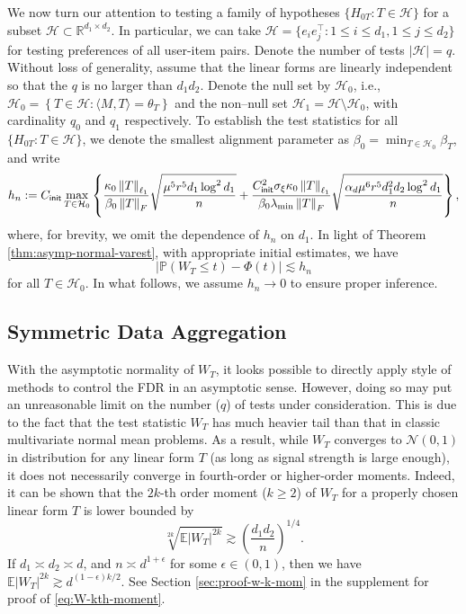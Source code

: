 \documentclass[12pt]{article}
\newcommand{\tF}{{\rm F}}
\newcommand{\abs}[1]{\left\lvert#1\right\rvert}
\newcommand{\norm}[1]{\left\lVert#1\right\rVert}
\newcommand{\R}{\mathbb{R}}
\newcommand{\E}{\mathbb{E}}
\newcommand{\cH}{\mathcal{H}}
\newcommand{\cN}{\mathcal{N}}
\newcommand{\init}{{\mathsf{init}}}
\theoremstyle{plain}
\begin{document}
\begin{sloppypar}
We now turn our attention to testing a family of hypotheses $\{H_{0T}: T\in \cH\}$ for a subset $\cH\subset \R^{d_1\times d_2}$. In particular, we can take $\cH=\{e_i e_j^\top: 1\le i\le d_1, 1\le j\le d_2\}$ for testing preferences of all user-item pairs. Denote the number of tests $\abs{\cH}=q$. Without loss of generality, assume that the linear forms are linearly independent so that the $q$ is no larger than $d_1 d_2$.  Denote the null set by $\cH_0$, i.e., $\cH_0=\left\{T\in \cH: \langle M,T\rangle=\theta_T \right\}$ and the non–null set $\cH_1=\cH\setminus \cH_0$, with cardinality $q_0$ and $q_1$ respectively. To establish the test statistics for all $\{H_{0T}: T\in \cH\}$, we denote the smallest alignment parameter as $\beta_0=\min_{T\in\cH_0}\beta_T$, and write
\begin{equation}\label{eq:fixed-asymp}
h_n:=  C_{\init} \max_{T\in\cH_0} \left\{ \frac{\kappa_0\norm{T}_{\ell_1}}{\beta_0 \norm{T}_{\tF}} \sqrt{\frac{ \mu^{5} r^5 d_1 \log^2 d_1  }{ n}} +  \frac{ C_{\init}^2\sigma_{\xi}  \kappa_0 \norm{T}_{\ell_1} }{\beta_0 \lambda_{\min}  \norm{T}_\tF }\sqrt{\frac{\alpha_d \mu^{6} r^{5 } d_1^2 d_2  \log^2 d_1 }{ n } } \right\},
\end{equation}
where, for brevity, we omit the dependence of $h_n$ on $d_1$. In light of Theorem \ref{thm:asymp-normal-varest}, with appropriate initial estimates, we have
$$
\left|\mathbb{P}\left(W_{T} \leq t\right)-\Phi\left(t\right)\right|\lesssim h_n
$$
for all $T\in \cH_0$. In what follows, we assume $h_n\to 0$ to ensure proper inference.

\subsection{Symmetric Data Aggregation}

With the asymptotic normality of $W_T$, it looks possible to directly apply \cite{benjamini1995controlling} style of methods to control the FDR in an asymptotic sense. However, doing so may put an unreasonable limit on the number ($q$) of tests under consideration. This is due to the fact that the test statistic $W_T$ has much heavier tail than that in classic multivariate normal mean problems. As a result, while $W_T$ converges to $\cN(0,1)$ in distribution for any linear form $T$ (as long as signal strength is large enough), it does not necessarily converge in fourth-order or higher-order moments. Indeed, it can be shown that the $2k$-th order moment ($k\ge 2$) of $W_T$ for a properly chosen linear form $T$ is lower bounded by
\begin{equation}\label{eq:W-kth-moment}
   \sqrt[2k]{ \E \abs{W_{T}}^{2k}} \gtrsim \left(\frac{d_1 d_2}{n}\right)^{1/4}.
\end{equation}
If $d_1\asymp d_2 \asymp d $, and $n \asymp d^{1+\epsilon }$ for some $\epsilon\in(0,1)$, then we have $\E \abs{W_{T}}^{2k} \gtrsim d^{(1-\epsilon)k/2}$. See Section  \ref{sec:proof-w-k-mom} in the supplement for proof of \eqref{eq:W-kth-moment}.


\end{sloppypar}
\end{document}
